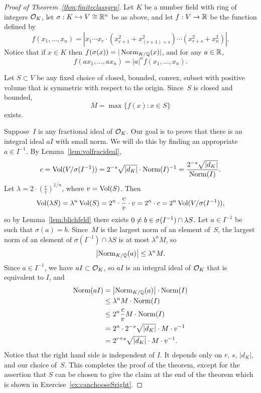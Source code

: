 \begin{proof}[Proof of Theorem~\ref{thm:finiteclassgrp}]
	Let $K$ be a number field with ring of integers $\mathcal{O}_K$,
	let $\sigma:K\hookrightarrow V\cong \mathbb{R}^n$ be as above,
	and let $f:V\to \mathbb{R}$ be the function defined by
	$$
		f(x_1,\ldots, x_n)
		= |x_1\cdots x_r\cdot (x_{r+1}^2 + x_{(r+1)+s}^2)\cdots (x_{r+s}^2 + x_n^2)|.
	$$
	Notice that if $x\in K$ then $f(\sigma(x)) = |\operatorname{Norm}_{K/\mathbb{Q}}(x)|$,
	and for any $a\in \mathbb{R}$,
	$$
		f(ax_1, \ldots,  ax_n) = |a|^n f(x_1,\ldots, x_n).
	$$

	Let $S\subset V$ be any fixed choice of closed, bounded, convex, subset with
	positive volume that is symmetric with respect to the origin.
	Since~$S$ is closed and bounded,
	$$
		M = \max\{f(x) : x \in S\}
	$$
	exists.

	Suppose~$I$ is any  fractional ideal of $\mathcal{O}_K$.  Our goal
	is to prove that there is an integral ideal $aI$ with small norm. We
	will do this by finding an appropriate $a\in I^{-1}$.
	By Lemma~\ref{lem:volfracideal},
	$$
		c = \operatorname{Vol}(V/\sigma(I^{-1}))
		= 2^{-s}\sqrt{|d_K|}\cdot \operatorname{Norm}(I)^{-1}
		= \frac{2^{-s} \sqrt{|d_K|}}{\operatorname{Norm}(I)}.
	$$
	Let $\lambda = 2\cdot\left(\frac{c}{v}\right)^{1/n}$, where $v=\operatorname{Vol}(S)$.
	Then
	$$
		\operatorname{Vol}(\lambda{} S) = \lambda^n \operatorname{Vol}(S)
		= 2^n\cdot \frac{c}{v} \cdot v
		= 2^n\cdot c
		= 2^n \operatorname{Vol}(V/\sigma(I^{-1})),
	$$
	so by Lemma~\ref{lem:blichfeld} there exists
	$0\neq b\in \sigma(I^{-1})\cap \lambda S$.
	Let $a \in I^{-1}$ be such that $\sigma(a)=b$.
	Since~$M$ is the largest norm of an element of~$S$, the largest norm
	of an element of $\sigma(I^{-1})\cap  \lambda{}S$ is at most $\lambda^n M$,
	so
	$$
		\left|\operatorname{Norm}_{K/\mathbb{Q}}(a)\right| \leq \lambda^n M.
	$$
	Since $a\in I^{-1}$, we have $aI \subset \mathcal{O}_K$, so
	$aI$ is an integral ideal of $\mathcal{O}_K$ that is equivalent to $I$, and
	\begin{align*}
		\operatorname{Norm}(aI) &= \left|\operatorname{Norm}_{K/\mathbb{Q}}(a)\right|\cdot \operatorname{Norm}(I) \\
		&\leq \lambda^n M\cdot \operatorname{Norm}(I) \\
		&\leq 2^n \frac{c}{v} M \cdot \operatorname{Norm}(I) \\
		&= 2^n\cdot 2^{-s} \sqrt{|d_K|} \cdot M \cdot v^{-1} \\
		&= 2^{r+s} \sqrt{|d_K|} \cdot M \cdot v^{-1}.
	\end{align*}
	Notice that the right hand side is independent of $I$.  It
	depends only on $r$, $s$, $|d_K|$, and our choice of~$S$.
	This completes the proof of the theorem, except for
	the assertion that $S$ can be chosen to give the claim
	at the end of the theorem which is shown in Exercise~\ref{ex:canchooseSright}.
\end{proof}

